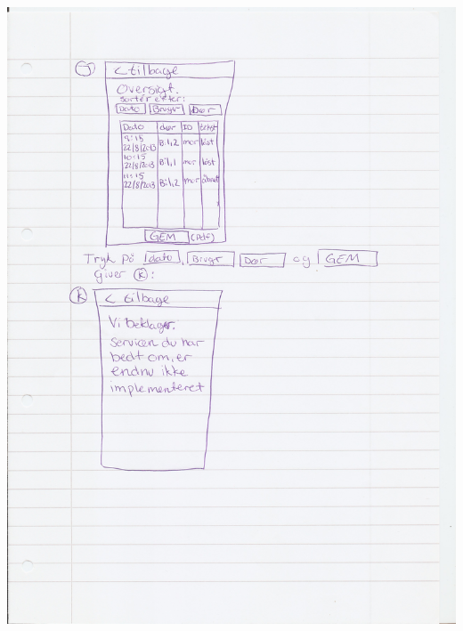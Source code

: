 \documentclass[a4paper,12pt]{article}
\begin{document}
\includegraphics[width=\textwidth]{proto/JK.jpg}
\end{document}
